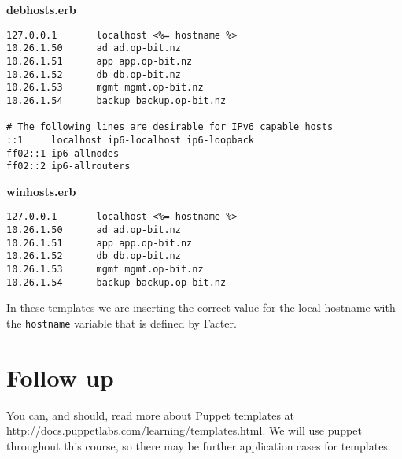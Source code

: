 \documentclass{article}   	%
\begin{document}
\textbf{debhosts.erb}
\begin{verbatim}
127.0.0.1       localhost <%= hostname %>
10.26.1.50      ad ad.op-bit.nz
10.26.1.51      app app.op-bit.nz
10.26.1.52      db db.op-bit.nz
10.26.1.53      mgmt mgmt.op-bit.nz
10.26.1.54      backup backup.op-bit.nz

# The following lines are desirable for IPv6 capable hosts
::1     localhost ip6-localhost ip6-loopback
ff02::1 ip6-allnodes
ff02::2 ip6-allrouters
\end{verbatim}


\textbf{winhosts.erb}
\begin{verbatim}
127.0.0.1       localhost <%= hostname %>
10.26.1.50      ad ad.op-bit.nz
10.26.1.51      app app.op-bit.nz
10.26.1.52      db db.op-bit.nz
10.26.1.53      mgmt mgmt.op-bit.nz
10.26.1.54      backup backup.op-bit.nz

\end{verbatim}

In these templates we are inserting the correct value for the local hostname with the \texttt{hostname} variable that is defined by Facter.


\section{Follow up}
You can, and should, read more about Puppet templates at http://docs.puppetlabs.com/learning/templates.html. We will use puppet throughout this course, so there may be further application cases for templates.
\end{document}
